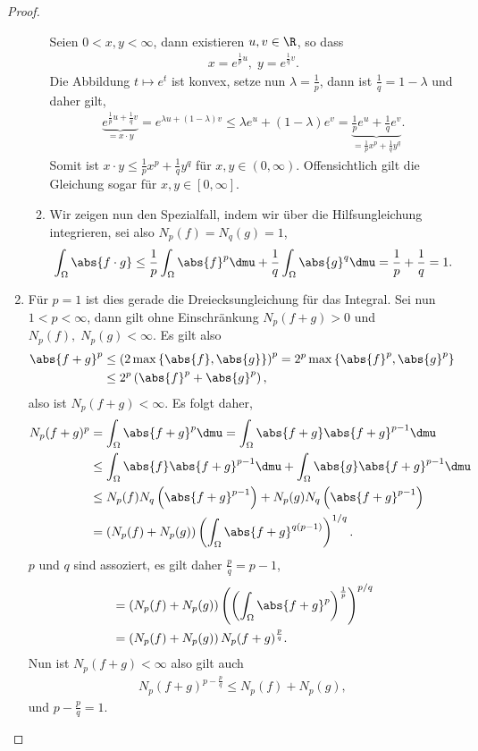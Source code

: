 \begin{proof}
\begin{enumerate}[label=\arabic{*}.)]
\begin{enumerate}[label=(\alph{*})]
Seien $0<x,y<\infty$, dann existieren $u,v\in\R$, so dass
\begin{align*}
x=e^{\frac{1}{p} u},\;y=e^{\frac{1}{q} v}.
\end{align*}
Die Abbildung $t\mapsto e^t$ ist konvex, setze nun 
$\lambda=\frac{1}{p}$, dann ist $\frac{1}{q}=1-\lambda$ und daher gilt,
\begin{align*}
\underbrace{e^{\frac{1}{p}u+\frac{1}{q}v}}_{=x\cdot y}
= e^{\lambda u + (1-\lambda) v}
 \le \lambda e^u + (1-\lambda) e^v = 
\underbrace{\frac{1}{p}e^{u}+\frac{1}{q}e^{v}}_{=\frac{1}{p}x^p +
\frac{1}{q}y^q}.
\end{align*}
Somit ist $x\cdot y \le \frac{1}{p}x^p +
\frac{1}{q}y^q$ für $x,y\in(0,\infty)$. Offensichtlich gilt die Gleichung 
sogar für $x,y\in[0,\infty]$.
\item Wir zeigen nun den Spezialfall, indem wir über die Hilfsungleichung
integrieren, sei also $N_p(f)=N_q(g)=1$,
\begin{align*}
\int_\Omega \abs{f\cdot g} \le \frac{1}{p}\int_\Omega \abs{f}^p\dmu +
\frac{1}{q}\int_\Omega \abs{g}^q \dmu = \frac{1}{p} + \frac{1}{q} = 1.
\end{align*}
\end{enumerate}
\item Für $p=1$ ist dies gerade die Dreiecksungleichung für das Integral. Sei
nun $1<p<\infty$, dann gilt ohne Einschränkung  $N_p(f+g)>0$ und
$N_p(f),\;N_p(g)<\infty$. Es gilt also
\begin{align*}
\abs{f+g}^p & \le \left(2\max\left\{ \abs{f},\abs{g}\right\}\right)^p
= 2^p \max\left\{ \abs{f}^p,\abs{g}^p\right\}
\\ &\le 2^p\left(\abs{f}^p + \abs{g}^p\right),
\end{align*}
also ist $N_p(f+g)<\infty$.
Es folgt daher,
\begin{align*}
N_p(f+g)^p &= \int_\Omega \abs{f+g}^p \dmu
= \int_\Omega \abs{f+g}\abs{f+g}^{p-1}\dmu
\\ &\le \int_\Omega \abs{f}\abs{f+g}^{p-1}\dmu + \int_\Omega
\abs{g}\abs{f+g}^{p-1}\dmu
 \\ &\le N_p(f)N_q\left(\abs{f+g}^{p-1}\right) +
 N_p(g)N_q\left(\abs{f+g}^{p-1}\right)
 \\ &= \left(N_p(f)+N_p(g) \right)\left(\int_\Omega
 \abs{f+g}^{q(p-1)}\right)^{1/q}.
\end{align*}
$p$ und $q$ sind assoziert, es gilt daher $\frac{p}{q}=p-1$,
\begin{align*}
&= \left(N_p(f)+N_p(g) \right)\left(\left(\int_\Omega
 \abs{f+g}^{p}\right)^{\frac{1}{p}}\right)^{p/q}
 \\ &= \left(N_p(f)+N_p(g) \right) N_p(f+g)^{\frac{p}{q}}.
\end{align*}
Nun ist $N_p(f+g)< \infty$ also gilt auch
\begin{align*}
N_p(f+g)^{p-\frac{p}{q}} \le N_p(f)+N_p(g),
\end{align*}
und $p-\frac{p}{q}=1$.\qedhere
\end{enumerate}
\end{proof}



